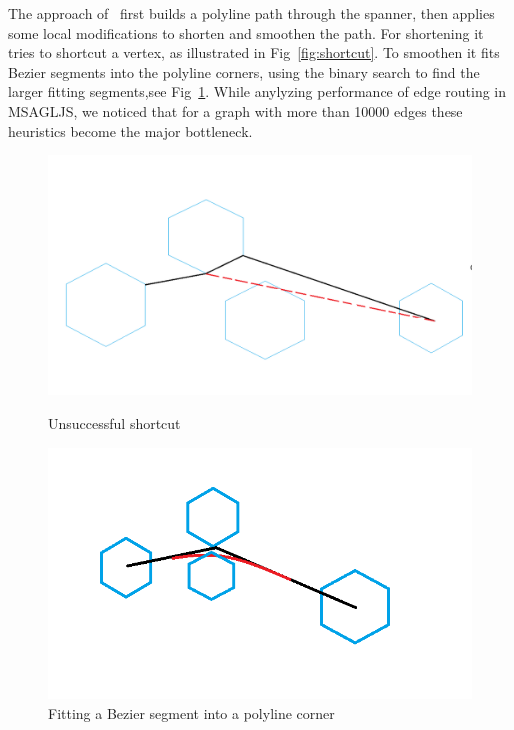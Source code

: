 \documentclass{gd-llncs}
\begin{document}
The approach of~\cite{dwyer2010fast} first builds a polyline path through the spanner, then applies some local modifications to shorten and smoothen the path. For shortening it tries to shortcut a vertex, as illustrated in Fig~\ref{fig:shortcut}. To smoothen it fits Bezier segments into the polyline corners, using the binary search to find the larger fitting segments,see Fig~\ref{fig:cornerfit}. While anylyzing performance of edge routing in MSAGLJS, we noticed that for a graph with more than 10000 edges these heuristics become the major bottleneck.
\begin{figure}[!tbp]
  \centering
  \begin{minipage}[b]{0.4\textwidth}
    \includegraphics[width=\textwidth]{./naive_shorcut_now_working.png}
    \caption{Unsuccessful shortcut}
    \label{fig:shortcut}
  \end{minipage}
  \hfill
  \begin{minipage}[b]{0.4\textwidth}
    \includegraphics[width=\textwidth]{fillet_corner.png}
    \caption{Fitting a Bezier segment into a polyline corner}
    \label{fig:cornerfit}
  \end{minipage}

\end{figure}
\end{document}
